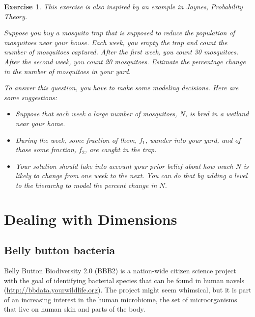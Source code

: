 \documentclass[12pt]{book}
\theoremstyle{exercise}
\newtheorem{exercise}{Exercise}[chapter]
\begin{document}
\begin{exercise}
This exercise is also inspired by an example in Jaynes, {\em
Probability Theory}.

Suppose you buy a mosquito trap that is supposed to reduce the
population of mosquitoes near your house.  Each
week, you empty the trap and count the number of mosquitoes
captured.  After the first week, you count 30 mosquitoes.
After the second week, you count 20 mosquitoes.  Estimate the
percentage change in the number of mosquitoes in your yard.

To answer this question, you have to make some modeling
decisions.  Here are some suggestions:

\begin{itemize}

\item Suppose that each week a large number of mosquitoes, $N$, is bred
in a wetland near your home.

\item During the week, some fraction of
them, $f_1$, wander into your yard, and of those some fraction, $f_2$,
are caught in the trap.

\item Your solution should take into account your prior belief
about how much $N$ is likely to change from one week to the next.
You can do that by adding a level to the hierarchy to
model the percent change in $N$.

\end{itemize}

\end{exercise}


\chapter{Dealing with Dimensions}
\label{species}

\section{Belly button bacteria}

Belly Button Biodiversity 2.0 (BBB2) is a nation-wide citizen
science project with the goal of identifying bacterial species that
can be found in human navels (\url{http://bbdata.yourwildlife.org}).
The project might seem whimsical, but it is part of an increasing
interest in the human microbiome, the set of microorganisms that live
on human skin and parts of the body.
\end{document}
